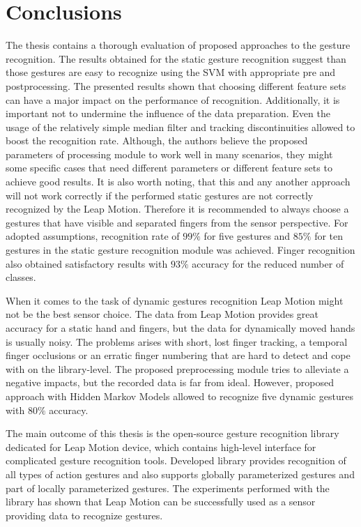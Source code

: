 \chapter{Conclusions}\label{conclusionsChapter}

The thesis contains a thorough evaluation of proposed approaches to the gesture recognition.
The results obtained for the static gesture recognition suggest than those gestures are easy to recognize using the SVM with appropriate pre and postprocessing.
The presented results shown that choosing different feature sets can have a major impact on the performance of recognition.
Additionally, it is important not to undermine the influence of the data preparation. 
Even the usage of the relatively simple median filter and tracking discontinuities allowed to boost the recognition rate.
Although, the authors believe the proposed parameters of processing module to work well in many scenarios, they might some specific cases that need different parameters or different feature sets to achieve good results.
It is also worth noting, that this and any another approach will not work correctly if the performed static gestures are not correctly recognized by the Leap Motion.
Therefore it is recommended to always choose a gestures that have visible and separated fingers from the sensor perspective.
For adopted assumptions, recognition rate of $99\%$ for five gestures and $85\%$ for ten gestures in the static gesture recognition module was achieved. Finger recognition also obtained satisfactory results with $93\%$ accuracy for the reduced number of classes.

When it comes to the task of dynamic gestures recognition Leap Motion might not be the best sensor choice.
The data from Leap Motion provides great accuracy for a static hand and fingers, but the data for dynamically moved hands is usually noisy.
The problems arises with short, lost finger tracking, a temporal finger occlusions or an erratic finger numbering that are hard to detect and cope with on the library-level.
The proposed preprocessing module tries to alleviate a negative impacts, but the recorded data is far from ideal.
However, proposed approach with Hidden Markov Models allowed to recognize five dynamic gestures with $80\%$ accuracy.

The main outcome of this thesis is the open-source gesture recognition library dedicated for Leap Motion device, which contains high-level interface for complicated gesture recognition tools. 
Developed library provides recognition of all types of action gestures and also supports globally parameterized gestures and part of locally parameterized gestures.
The experiments performed with the library has shown that Leap Motion can be successfully used as a sensor providing data to recognize gestures.


